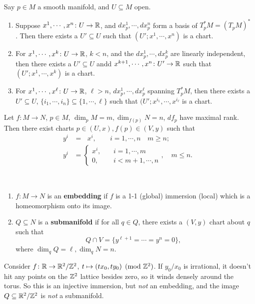 \begin{prop}
    Say $p \in M$ a smooth manifold, and $U \subseteq M$ open.
    \begin{enumerate}[label=(\roman*)]
        \item Suppose $x^1,\cdots ,x^n  \colon U \to \mathbb{R}$, and $dx^1_p ,\cdots ,dx_p ^n $ form a basis of $T_p^*M=(T_pM)^*$. Then there exists a $U' \subseteq U$ such that $(U'; x^1,\cdots ,x^n )$ is a chart.
        \item For $x^1,\cdots ,x^k \colon U \to \mathbb{R}$, $k<n$, and the $dx_p^1,\cdots ,dx_p^k$ are linearly independent, then there exists a $U' \subseteq U$ andd $x^{k+1},\cdots ,x^n  \colon U' \to \mathbb{R}$ such that $(U' ; x^1,\cdots ,x^k)$ is a chart.
        \item For $x^1,\cdots ,x^{\ell}\colon U \to \mathbb{R}$, $\ell >n$, $dx_p^1,\cdots ,dx_p ^{\ell}$ spanning $T_p^*M$, then there exists a $U' \subseteq U$, $\{i_1,\cdots ,i_n \} \subseteq \{1,\cdots ,\ell\} $ such that $(U' ; x^{i_1},\cdots ,x^{i_{\ell}}$ is a chart.
    \end{enumerate}
\end{prop}

\begin{theorem}
    Let $f \colon M \to N$,  $p \in M$, $\dim _p M=m, \dim _{f(p)}N=n$, $df_p$ have maximal rank. Then there exist charts $p \in (U,x), f(p) \in (V,y)$ such that 
    \begin{align*}
        y^i &=\ \ \, x^i , \qquad i=1,\cdots ,n \quad m\geq n;\\
        y^i &=
        \begin{cases}
            x^i ,  \quad &i=1,\cdots ,m\\
            0,& i<m+1,\cdots ,n
        \end{cases}, \quad m \leq n.
    \end{align*}
\end{theorem}

\begin{definition}[]
\,
   \begin{enumerate}[label=(\arabic*)]
       \item $f \colon M \to N$ is an \textbf{embedding} if $f$ is a 1-1 (global) immersion (local) which is a homeomorphism onto its image.
       \item $Q \subseteq N$ is a \textbf{submanifold} if for all $q \in Q$, there exists a $(V,y)$ chart about $q$ such that \[
       Q \cap V= \{y ^{\ell+1}= \cdots =y^n =0\} ,
       \] where $\dim_q Q=\ell, \dim _q N=n$.
   \end{enumerate} 
\end{definition}
\begin{example}
    Consider $f \colon \mathbb{R} \to \mathbb{R}^2 / \mathbb{Z}^2$, $t \mapsto  (tx_0, ty_0) \pmod{\mathbb{Z}^2}$. If $y_0 /x_0$ is irrational, it doesn't hit any points on the $\mathbb{Z}^2$ lattice besides zero, so it winds densely around the torus. So this is an injective immersion, but \emph{not} an embedding, and the image $Q \subseteq \mathbb{R}^2 /\mathbb{Z}^2$ is \emph{not} a submanifold.
\end{example}
